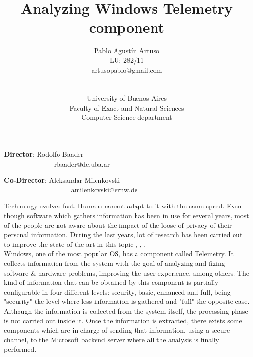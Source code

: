\documentclass{article}
\begin{document}
\title{Analyzing Windows Telemetry component}
\author{Pablo Agust\'in Artuso \\ LU: 282/11 \\ artusopablo@gmail.com \\ \\ \\  University of Buenos Aires \\ Faculty of Exact and Natural Sciences \\ Computer Science department}

\maketitle

\begin{flushleft}
{\bfseries Director}:  Rodolfo Baader \\ \mbox{\ \ \ \ \ \ \ \ \ \ \ \ \ \ } rbaader@dc.uba.ar \\ 

\bigskip

{\bfseries Co-Director}:  Aleksandar Milenkovski \\ \mbox{\ \ \ \ \ \ \ \ \ \ \ \ \ \ \ \ \ \ \ } amilenkovski@ernw.de

\end{flushleft}

Technology evolves fast. Humans cannot adapt to it with the same speed. Even though software which gathers information has been in use for several years, most of the people are not aware about the impact of the loose of privacy of their personal information. During the last years, lot of research has been carried out to improve the state of the art in this topic \cite{1}, \cite{2}, \cite{3}.\\

Windows, one of the most popular OS, has a component called Telemetry. It collects information from the system with the goal of analyzing and fixing software \& hardware problems, improving the user experience, among others. The kind of information that can be obtained by this component is partially configurable in four different levels: security, basic, enhanced and full, being "security" the level where less information is gathered and "full" the opposite case. Although the information is collected from the system itself, the processing phase is not carried out inside it. Once the information is extracted, there exists some components which are in charge of sending that information, using a secure channel, to the Microsoft backend server where all the analysis is finally performed. \\
\end{document}
